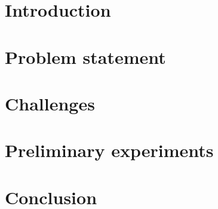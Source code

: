 \documentclass[sigconf]{acmart}
\theoremstyle{remark}
\begin{document}



\maketitle

\thispagestyle{empty}

\section{Introduction}


\section{Problem statement}


\section{Challenges}


\section {Preliminary experiments}


\section{Conclusion}




\end{document}
